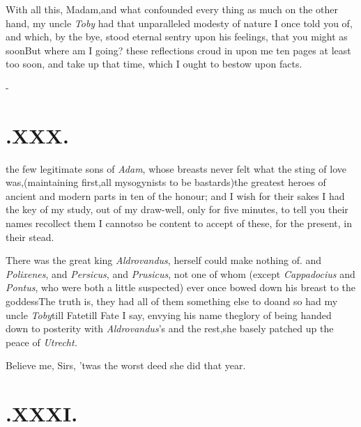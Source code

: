 \documentclass{article}
\begin{document}
\etp
With all this, Madam,\tsk and what confounded every thing as
much on the other hand, my uncle \textit{Toby} had that unparalleled
modesty of nature I once told you of, and which, by the bye,
stood\break
eternal sentry upon his feelings, that you might as soon\tsh But where am I going?
these reflections croud in upon me ten pages at least too soon, and
take up that time, which I ought to bestow upon facts.

\etp{}\eject
\null\kern-\baselineskip
\section{.\enspace XXX.}

 the few legitimate sons of
\textit{Adam}, whose breasts never felt what the sting of love
was,\tsh (maintaining first,\break all mysogynists to be
bastards)\tsk the greatest heroes of ancient and modern
parts in ten of the honour; and I wish\break
for their sakes I had the key of my\break
study, out of my draw-well, only for\break
five minutes, to tell you their names\tsk\break
recollect them I cannot\tsk so be content\break
to accept of these, for the present, in\break
their stead.\tsh

There was the great king \textit{Aldrovandus},\break
{}
\break
herself could make nothing of.\tsh{}
and \textit{Polixenes}, and \textit{Persicus}, and \textit{Prusicus}, not one
of whom (except \textit{Cappadocius} and \textit{Pontus}, who were both
a little suspected) ever once bowed down his breast to the
goddess\tsh The truth is, they had all of them something
else to do\tsk and so had my uncle \textit{Toby}\tsk till
Fate\tsk till Fate I say, envying his name the\break glory of being
handed down to posterity with \textit{Aldrovandus}’s and the
rest,\tsk she basely patched up the peace of \textit{Utrecht.}

\tsh Believe me, Sirs, ’twas the worst deed she
did that year.

\setlength{\baselineskip}{12.7826pt}
\section{.\enspace XXXI.}
\end{document}
